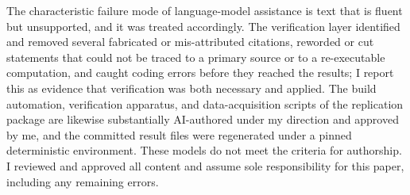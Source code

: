 The characteristic failure mode of language-model assistance is text that is
fluent but unsupported, and it was treated accordingly. The verification
layer identified and removed several fabricated or mis-attributed citations,
reworded or cut statements that could not be traced to a primary source or
to a re-executable computation, and caught coding errors before they reached
the results; I report this as evidence that verification was both necessary
and applied. The build automation, verification apparatus, and
data-acquisition scripts of the replication package are likewise
substantially AI-authored under my direction and approved by me, and the
committed result files were regenerated under a pinned deterministic
environment. These models do not meet the criteria for authorship. I
reviewed and approved all content and assume sole responsibility for this
paper, including any remaining errors.
